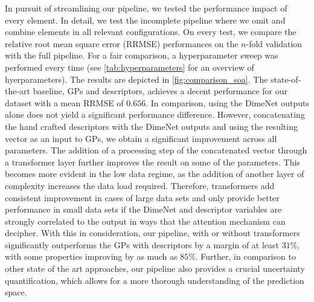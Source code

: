 \documentclass[
  english,        %
  font=times,     %
  onecolumn,      %
]{article}
\begin{document}
In pursuit of streamlining our pipeline, we tested the performance impact of every element. In detail, we test the incomplete pipeline where we omit and combine elements in all relevant configurations. On every test, we compare the relative root mean square error (RRMSE) performances on the $n$-fold validation with the full pipeline. For a fair comparison, a hyperparameter sweep was performed every time (see \cref{tab:hyperparameters} for an overview of hyerparameters). The results are depicted in \cref{fig:comparison_soa}. The state-of-the-art baseline, GPs and descriptors, achieves a decent performance for our dataset with a mean RRMSE of $0.656$. In comparison, using the DimeNet outputs alone does not yield a significant performance difference. However, concatenating the hand crafted descriptors with the DimeNet outputs and using the resulting vector as an input to GPs, we obtain a significant  improvement across all parameters. The addition of a processing step of the concatenated vector through a transformer layer further improves the result on some of the parameters. This becomes more evident in the low data regime, as the addition of another layer of complexity increases the data load required. Therefore, transformers add consistent improvement in cases of large data sets and only provide better performance in small data sets if the DimeNet and descriptor variables are strongly correlated to the output in ways that the attention mechanism can decipher.
With this in consideration, our pipeline, with or without transformers significantly outperforms the GPs with descriptors by a margin of at least $31 \%$, with some properties improving by as much as $85\%$.
Further, in comparison to other state of the art approaches, our pipeline also provides a crucial uncertainty quantification, which allows for a more thorough understanding of the prediction space.

\end{document}
